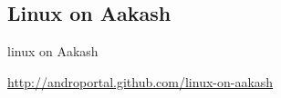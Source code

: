 \documentclass{beamer}
\begin{document}
 \subsection{Linux on Aakash}
  \begin{frame}{linux on Aakash}
    \begin{block}{}
      \centerline {\url{http://androportal.github.com/linux-on-aakash}}
    \end{block}
  \end{frame}









\end{document}
